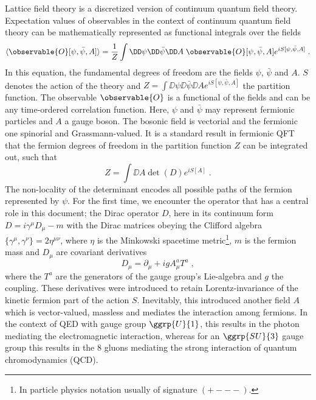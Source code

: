 Lattice field theory is a discretized version of continuum quantum field theory.
Expectation values of observables in the context of continuum quantum field theory can be mathematically represented as functional integrals over the fields~\cite{Feynman1948}
\begin{equation} \label{eq:path:integral:expectation:value}
\langle \observable{O}[\psi, \bar{\psi}, A] \rangle =
\frac{1}{Z} \int
\DD \psi
\DD \bar{\psi}
\DD A \;
\observable{O}[\psi, \bar{\psi}, A]
e^{i S[\psi, \bar{\psi}, A]} \;.
\end{equation}
In this equation, the fundamental degrees of freedom are the fields $\psi$, $\bar{\psi}$ and $A$.
$S$ denotes the action of the theory and $Z = \int \DD \psi \DD \bar{\psi} \DD A e^{i S[\psi, \bar{\psi}, A]}$ the partition function.
The observable $\observable{O}$ is a functional of the fields and can be any time-ordered correlation function.
Here, $\psi$ and $\bar{\psi}$ may represent fermionic particles and $A$ a gauge boson.
The bosonic field is vectorial and the fermionic one spinorial and Grassmann-valued.
It is a standard result in fermionic QFT that the fermion degrees of freedom in the partition function $Z$ can be integrated out, such that
\begin{equation}
Z = \int \DD A \det(D) e^{i S[A]} \;.
\end{equation}
The non-locality of the determinant encodes all possible paths of the fermion represented by $\psi$.
For the first time, we encounter the operator that has a central role in this document; the Dirac operator $D$, here in its continuum form $D = i \gamma^{\mu} D_{\mu} - m$ with the Dirac matrices obeying the Clifford algebra $\{\gamma^{\mu}, \gamma^{\nu}\} = 2 \eta^{\mu \nu}$, where $\eta$ is the Minkowski spacetime metric\footnote{In particle physics notation usually of signature $(+---)$.}, $m$ is the fermion mass and $D_{\mu}$ are covariant derivatives
\begin{equation}
D_{\mu} = \partial_{\mu} + ig A_{\mu}^{a} T^{a} \;,
\end{equation}
where the $T^{a}$ are the generators of the gauge group's Lie-algebra and $g$ the coupling.
These derivatives were introduced to retain Lorentz-invariance of the kinetic fermion part of the action $S$.
Inevitably, this introduced another field $A$ which is vector-valued, massless and mediates the interaction among fermions.
In the context of QED with gauge group $\ggrp{U}{1}$, this results in the photon mediating the electromagnetic interaction, whereas for an $\ggrp{SU}{3}$ gauge group this results in the \num{8} gluons mediating the strong interaction of quantum chromodynamics (QCD).

